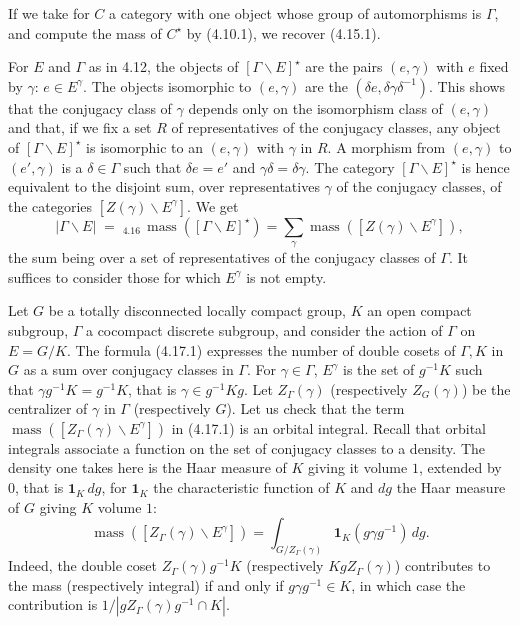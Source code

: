 \documentclass[10pt]{article}
\newcommand{\mass}{\operatorname{mass}}
\theoremstyle{deligne}
\newcommand{\heading}[1]{\vspace{0.7em}\noindent{\bfseries #1}\quad}
\begin{document}
If we take for $C$ a category with one object whose group of automorphisms is $\Gamma$, and compute the mass of $C^\star$ by (4.10.1), we recover (4.15.1).

\heading{Example 4.17.} For $E$ and $\Gamma$ as in 4.12, the objects of $[\Gamma\backslash E]^\star$ are the pairs $(e,\gamma)$ with $e$ fixed by $\gamma$: $e\in E^\gamma$. The objects isomorphic to $(e,\gamma)$ are the $(\delta e,\delta\gamma\delta^{-1})$. This shows that the conjugacy class of $\gamma$ depends only on the isomorphism class of $(e,\gamma)$ and that, if we fix a set $R$ of representatives of the conjugacy classes, any object of $[\Gamma\backslash E]^\star$ is isomorphic to an $(e,\gamma)$ with $\gamma$ in $R$. A morphism from $(e,\gamma)$ to $(e',\gamma)$ is a $\delta\in\Gamma$ such that $\delta e=e'$ and $\gamma\delta=\delta\gamma$. The category $[\Gamma\backslash E]^\star$ is hence equivalent to the disjoint sum, over representatives $\gamma$ of the conjugacy classes, of the categories $[Z(\gamma)\backslash E^\gamma]$. We get
\begin{equation}\tag{4.17.1}
|\Gamma\backslash E|\;=\;{}_{4.16}\,\mass([\Gamma\backslash E]^\star)
=\sum_\gamma \mass([Z(\gamma)\backslash E^\gamma]),
\end{equation}
the sum being over a set of representatives of the conjugacy classes of $\Gamma$. It suffices to consider those for which $E^\gamma$ is not empty.

\heading{Example 4.18.} Let $G$ be a totally disconnected locally compact group, $K$ an open compact subgroup, $\Gamma$ a cocompact discrete subgroup, and consider the action of $\Gamma$ on $E=G/K$. The formula (4.17.1) expresses the number of double cosets of $\Gamma,K$ in $G$ as a sum over conjugacy classes in $\Gamma$. For $\gamma\in\Gamma$, $E^\gamma$ is the set of $g^{-1}K$ such that $\gamma g^{-1}K=g^{-1}K$, that is $\gamma\in g^{-1}Kg$. Let $Z_\Gamma(\gamma)$ (respectively $Z_G(\gamma)$) be the centralizer of $\gamma$ in $\Gamma$ (respectively $G$). Let us check that the term $\mass([Z_\Gamma(\gamma)\backslash E^\gamma])$ in (4.17.1) is an orbital integral. Recall that orbital integrals associate a function on the set of conjugacy classes to a density. The density one takes here is the Haar measure of $K$ giving it volume $1$, extended by $0$, that is $\mathbf 1_K\,dg$, for $\mathbf 1_K$ the characteristic function of $K$ and $dg$ the Haar measure of $G$ giving $K$ volume $1$:
\begin{equation}\tag{4.18.1}
\mass([Z_\Gamma(\gamma)\backslash E^\gamma])=
\int_{G/Z_\Gamma(\gamma)}\mathbf 1_K(g\gamma g^{-1})\,dg.
\end{equation}
Indeed, the double coset $Z_\Gamma(\gamma)g^{-1}K$ (respectively $KgZ_\Gamma(\gamma)$) contributes to the mass (respectively integral) if and only if $g\gamma g^{-1}\in K$, in which case the contribution is $1/|gZ_\Gamma(\gamma)g^{-1}\cap K|$.
\end{document}
